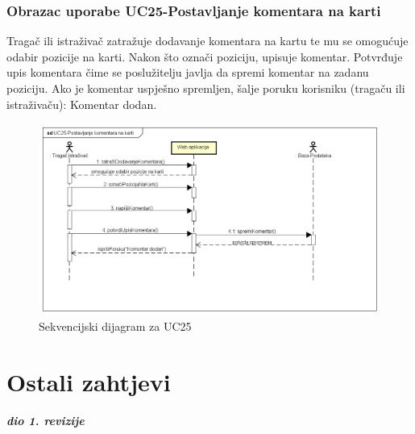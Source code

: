 	
				\subsubsection{Obrazac uporabe UC25-Postavljanje komentara na karti}
				
				{Tragač ili istraživač zatražuje dodavanje komentara na kartu te mu se omogućuje odabir pozicije na karti. Nakon što označi poziciju, upisuje komentar. Potvrđuje upis komentara čime se poslužitelju javlja da spremi komentar na zadanu poziciju. Ako je komentar uspješno spremljen, šalje poruku korisniku (tragaču ili istraživaču): Komentar dodan.}
				\begin{figure}[H]
					\includegraphics[width=\textwidth]{slike/UC25-PostavljanjeKomentaraNaKarti} %
					\caption{Sekvencijski dijagram za UC25}
					\label{fig:promjene2} %
				\end{figure}
				\eject
				
				
		\section{Ostali zahtjevi}
		
			\textbf{\textit{dio 1. revizije}}\\
		 
